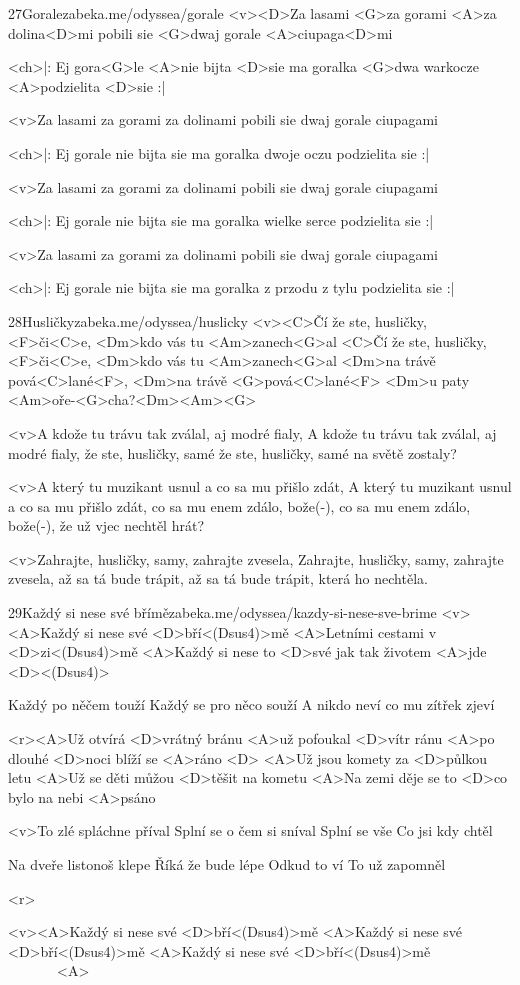 \begin{song}[Čechomor]{27}{Gorale}{zabeka.me/odyssea/gorale}
	<v><D>Za lasami <G>za gorami <A>za dolina<D>mi
	pobili sie <G>dwaj gorale <A>ciupaga<D>mi

	<ch>|: Ej gora<G>le <A>nie bijta <D>sie
	ma goralka <G>dwa warkocze
	<A>podzielita <D>sie :|

	<v>Za lasami za gorami za dolinami
	pobili sie dwaj gorale ciupagami

	<ch>|: Ej gorale nie bijta sie
	ma goralka dwoje oczu
	podzielita sie :|

	<v>Za lasami za gorami za dolinami
	pobili sie dwaj gorale ciupagami

	<ch>|: Ej gorale nie bijta sie
	ma goralka wielke serce
	podzielita sie :|

	<v>Za lasami za gorami za dolinami
	pobili sie dwaj gorale ciupagami

	<ch>|: Ej gorale nie bijta sie
	ma goralka z przodu z tylu
	podzielita sie :|

\end{song}
\begin{song}{28}{Husličky}{zabeka.me/odyssea/huslicky}
	<v><C>Čí že ste, husličky, <F>či<C>e,
	<Dm>kdo vás tu <Am>zanech<G>al
	<C>Čí že ste, husličky, <F>či<C>e,
	<Dm>kdo vás tu <Am>zanech<G>al
	<Dm>na trávě pová<C>lané<F>,
	<Dm>na trávě <G>pová<C>lané<F>
	<Dm>u paty <Am>oře-<G>cha?<Dm><Am><G>

	<v>A kdože tu trávu tak zválal, aj modré fialy,
	A kdože tu trávu tak zválal, aj modré fialy,
	že ste, husličky, samé
	že ste, husličky, samé na světě zostaly?

	<v>A který tu muzikant usnul a co sa mu přišlo zdát,
	A který tu muzikant usnul a co sa mu přišlo zdát,
	co sa mu enem zdálo, bože(-),
	co sa mu enem zdálo, bože(-), že už vjec nechtěl hrát?

	<v>Zahrajte, husličky, samy, zahrajte zvesela,
	Zahrajte, husličky, samy, zahrajte zvesela,
	až sa tá bude trápit,
	až sa tá bude trápit, která ho nechtěla.
\end{song}
\begin{song}{29}{Každý si nese své břímě}{zabeka.me/odyssea/kazdy-si-nese-sve-brime}
	<v><A>Každý si nese své <D>bří<(Dsus4)>mě
	<A>Letními cestami v <D>zi<(Dsus4)>mě
	<A>Každý si nese to <D>své
	jak tak životem <A>jde <D><(Dsus4)>

	Každý po něčem touží
	Každý se pro něco souží
	A nikdo neví
	co mu zítřek zjeví

	<r><A>Už otvírá <D>vrátný bránu
	<A>už pofoukal <D>vítr ránu
	<A>po dlouhé <D>noci blíží se <A>ráno <D>
	<A>Už jsou komety za <D>půlkou letu
	<A>Už se děti můžou <D>těšit na kometu
	<A>Na zemi děje se to <D>co bylo na nebi <A>psáno

	<v>To zlé spláchne příval
	Splní se o čem si sníval
	Splní se vše
	Co jsi kdy chtěl

	Na dveře listonoš klepe
	Říká že bude lépe
	Odkud to ví
	To už zapomněl

	<r>

	<v><A>Každý si nese své <D>bří<(Dsus4)>mě
	<A>Každý si nese své <D>bří<(Dsus4)>mě
	<A>Každý si nese své <D>bří<(Dsus4)>mě \ \ \ \ \ \ \ <A>
\end{song}
